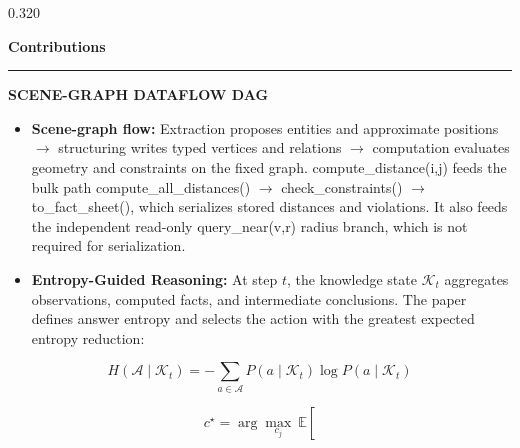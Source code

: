 \documentclass{beamer}
\newenvironment{possection}[2]{%
  \par\vspace{0.10cm}%
  \noindent{\color{ncgreendark}\bfseries\large #1}\hspace{0.42em}%
  {\color{ncink}\bfseries\large #2}\par\vspace{-0.20cm}%
  \noindent\textcolor{ncline}{\rule{\linewidth}{0.9pt}}\par\vspace{0cm}%
  \begin{minipage}{\linewidth}%
}{%
  \end{minipage}\par\vspace{0.40cm}%
}
\newcommand{\heil}[1]{{\color{ncink}\bfseries #1:}\hspace{0.3em}}
\newcommand{\apicode}[1]{{\ttfamily\small #1}}
\begin{document}
\begin{frame}[t]
\begin{columns}[t,onlytextwidth]
\begin{column}{0.320\textwidth}
\begin{possection}{3.}{Contributions}
\begin{center}
    \end{center}
    \vspace{0.06cm}
    {\centering\ttfamily\normalsize\bfseries\color{ncgreendark}
      SCENE-GRAPH DATAFLOW DAG\par}
    \par\vspace{0.22cm}
    \begin{itemize}\setlength{\itemsep}{0pt}
      \item \heil{Scene-graph flow} Extraction proposes entities and approximate
      positions $\rightarrow$ structuring writes typed vertices and relations
      $\rightarrow$ computation evaluates geometry and constraints on the fixed
      graph. \apicode{compute\_distance(i,j)} feeds the bulk path
      \apicode{compute\_all\_distances()} $\rightarrow$
      \apicode{check\_constraints()} $\rightarrow$
      \apicode{to\_fact\_sheet()}, which serializes stored distances and
      violations. It also feeds the independent read-only
      \apicode{query\_near(v,r)} radius branch, which is not required for
      serialization.
      \item \heil{Entropy-Guided Reasoning} At step $t$, the knowledge state
      $\mathcal{K}_t$ aggregates observations, computed facts, and intermediate
      conclusions. The paper defines answer entropy and selects the action with
      the greatest expected entropy reduction:
    \end{itemize}
    \par\vspace{-0.05cm}
    \begingroup
    \fontsize{28}{32}\selectfont
    \setlength{\abovedisplayskip}{0.02cm}
    \setlength{\belowdisplayskip}{0.02cm}
    \setlength{\abovedisplayshortskip}{0.02cm}
    \setlength{\belowdisplayshortskip}{0.02cm}
    \begin{equation}
      H(\mathcal{A}\mid\mathcal{K}_t)
      =-\sum_{a\in\mathcal{A}}P(a\mid\mathcal{K}_t)
      \log P(a\mid\mathcal{K}_t)
    \end{equation}
    \vspace{-0.10cm}
    \noindent
    \begin{minipage}[c]{0.59\linewidth}
      \begin{equation}
        c^\star=\arg\max_{c_j}\ \mathbb{E}\!\left[

\end{equation}
\end{minipage}
\end{possection}
\end{column}
\end{columns}
\end{frame}
\end{document}
